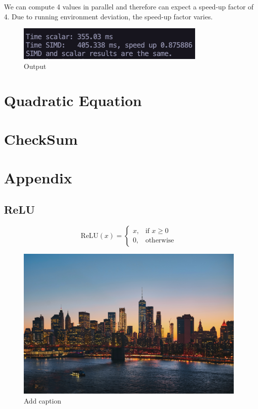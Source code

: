 \documentclass{article}
\begin{document}
\noindent We can compute 4 values in parallel and therefore can expect a speed-up factor of 4. Due to running environment deviation, the speed-up factor varies.
\begin{figure}[H]
    \centering
    \includegraphics[scale=0.5]{matrix-output.png} 
    \caption{Output}
    \label{fig:example}
  \end{figure}
\section{Quadratic Equation}
\section{CheckSum}

\section{Appendix}
\subsection{ReLU}\label{subsec:ReLU}
\begin{center}
    \end{center}
    \[
    \text{ReLU}(x) =
    \begin{cases}
    x, & \text{if } x \geq 0 \\
    0, & \text{otherwise}
    \end{cases}
    \]



\begin{figure}[H]
  \centering
  \includegraphics[width=\textwidth]{filler.png} 
  \caption{Add caption}
  \label{fig:example}
\end{figure}
\end{document}

